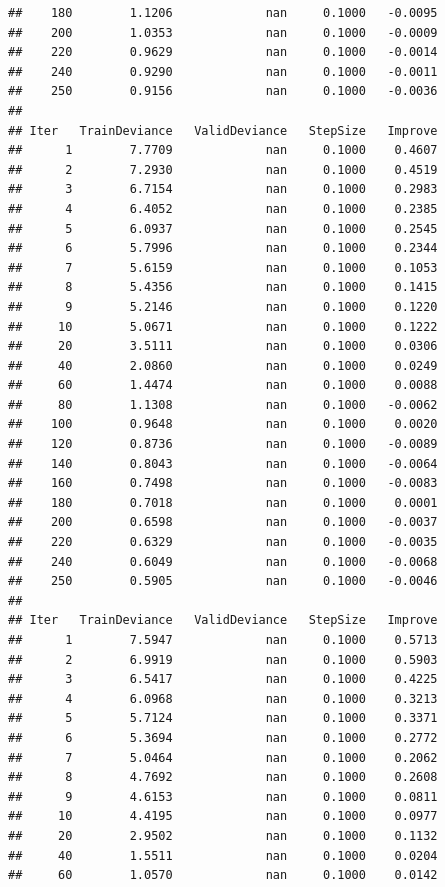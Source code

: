 \documentclass[]{book}
\begin{document}
\begin{verbatim}
##    180        1.1206             nan     0.1000   -0.0095
##    200        1.0353             nan     0.1000   -0.0009
##    220        0.9629             nan     0.1000   -0.0014
##    240        0.9290             nan     0.1000   -0.0011
##    250        0.9156             nan     0.1000   -0.0036
## 
## Iter   TrainDeviance   ValidDeviance   StepSize   Improve
##      1        7.7709             nan     0.1000    0.4607
##      2        7.2930             nan     0.1000    0.4519
##      3        6.7154             nan     0.1000    0.2983
##      4        6.4052             nan     0.1000    0.2385
##      5        6.0937             nan     0.1000    0.2545
##      6        5.7996             nan     0.1000    0.2344
##      7        5.6159             nan     0.1000    0.1053
##      8        5.4356             nan     0.1000    0.1415
##      9        5.2146             nan     0.1000    0.1220
##     10        5.0671             nan     0.1000    0.1222
##     20        3.5111             nan     0.1000    0.0306
##     40        2.0860             nan     0.1000    0.0249
##     60        1.4474             nan     0.1000    0.0088
##     80        1.1308             nan     0.1000   -0.0062
##    100        0.9648             nan     0.1000    0.0020
##    120        0.8736             nan     0.1000   -0.0089
##    140        0.8043             nan     0.1000   -0.0064
##    160        0.7498             nan     0.1000   -0.0083
##    180        0.7018             nan     0.1000    0.0001
##    200        0.6598             nan     0.1000   -0.0037
##    220        0.6329             nan     0.1000   -0.0035
##    240        0.6049             nan     0.1000   -0.0068
##    250        0.5905             nan     0.1000   -0.0046
## 
## Iter   TrainDeviance   ValidDeviance   StepSize   Improve
##      1        7.5947             nan     0.1000    0.5713
##      2        6.9919             nan     0.1000    0.5903
##      3        6.5417             nan     0.1000    0.4225
##      4        6.0968             nan     0.1000    0.3213
##      5        5.7124             nan     0.1000    0.3371
##      6        5.3694             nan     0.1000    0.2772
##      7        5.0464             nan     0.1000    0.2062
##      8        4.7692             nan     0.1000    0.2608
##      9        4.6153             nan     0.1000    0.0811
##     10        4.4195             nan     0.1000    0.0977
##     20        2.9502             nan     0.1000    0.1132
##     40        1.5511             nan     0.1000    0.0204
##     60        1.0570             nan     0.1000    0.0142

\end{verbatim}
\end{document}
